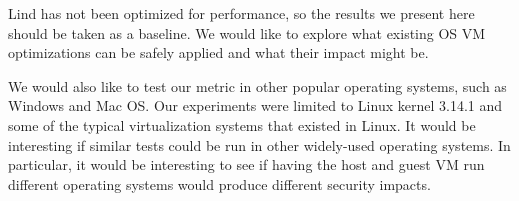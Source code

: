Lind has not been optimized for performance, so the results we present here should be taken as a baseline.
We would like to explore what existing OS VM optimizations can be safely applied
and what their impact might be.

We would also like to test our metric in other popular operating systems, such as Windows and Mac OS.
Our experiments were limited to Linux kernel 3.14.1 and some of the typical virtualization systems that existed in Linux.
It would be interesting
if similar tests could be run in other widely-used operating systems. In particular, it would be interesting to see if
having the host and guest VM run different operating systems would produce different security impacts.
